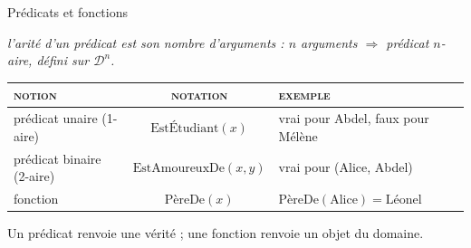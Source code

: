 \documentclass[aspectratio=169,10pt]{beamer}
\begin{document}
\begin{frame}{Prédicats et fonctions}
  \begin{center}
    \small\itshape\color{ash}
    l'arité d'un prédicat est son nombre d'arguments : $n$ arguments
    $\Rightarrow$ prédicat $n$-aire, défini sur $\mathcal{D}^n$.
  \end{center}

  \vspace{0.6em}
  \begin{center}
  \footnotesize
  \renewcommand{\arraystretch}{1.7}
  \begin{tabular}{@{} l c >{\raggedright\arraybackslash}m{3.0cm} @{}}
    \toprule
    {\color{ash}\scshape\footnotesize notion} &
    {\color{ash}\scshape\footnotesize notation} &
    {\color{ash}\scshape\footnotesize exemple} \\
    \midrule
    prédicat unaire (1-aire) & $\text{EstÉtudiant}(x)$ &
      vrai pour Abdel, faux pour Mélène \\
    prédicat binaire (2-aire) & $\text{EstAmoureuxDe}(x,y)$ &
      vrai pour (Alice, Abdel) \\
    fonction & $\text{PèreDe}(x)$ &
      $\text{PèreDe}(\text{Alice}) = \text{Léonel}$ \\
    \bottomrule
  \end{tabular}
  \end{center}

  \vspace{0.6em}
  \begin{center}
    \small Un prédicat renvoie une \alert{vérité} ; une fonction renvoie un
    objet du domaine.
  \end{center}
\end{frame}
\end{document}
